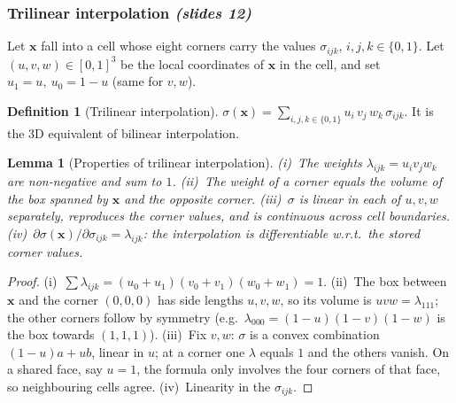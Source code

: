 \documentclass[11pt,a4paper]{article}
\newcommand{\xx}{\boldsymbol{x}}
\newcommand{\sref}[1]{\texorpdfstring{\emph{(slides #1)}}{(slides #1)}}
\theoremstyle{definition}
\newtheorem{definition}{Definition}[section]
\theoremstyle{plain}
\newtheorem{lemma}{Lemma}[section]
\begin{document}
\subsubsection*{Trilinear interpolation \sref{12}}

Let $\xx$ fall into a cell whose eight corners carry the values $\sigma_{ijk}$, $i,j,k\in\{0,1\}$. Let $(u,v,w)\in[0,1]^3$ be the local coordinates of $\xx$ in the cell, and set $u_1=u,\ u_0=1-u$ (same for $v,w$).

\begin{definition}[Trilinear interpolation]
$\displaystyle \sigma(\xx)=\sum_{i,j,k\in\{0,1\}}u_i\,v_j\,w_k\,\sigma_{ijk}.$
It is the 3D equivalent of bilinear interpolation.
\end{definition}

\begin{lemma}[Properties of trilinear interpolation]\label{lem:trilin}
(i)~The weights $\lambda_{ijk}=u_iv_jw_k$ are non-negative and sum to $1$.
(ii)~The weight of a corner equals the volume of the box spanned by $\xx$ and the \emph{opposite} corner.
(iii)~$\sigma$ is linear in each of $u,v,w$ separately, reproduces the corner values, and is continuous across cell boundaries.
(iv)~$\partial\sigma(\xx)/\partial\sigma_{ijk}=\lambda_{ijk}$: the interpolation is differentiable w.r.t.\ the stored corner values.
\end{lemma}
\begin{proof}
(i)~$\sum\lambda_{ijk}=(u_0+u_1)(v_0+v_1)(w_0+w_1)=1$. (ii)~The box between $\xx$ and the corner $(0,0,0)$ has side lengths $u,v,w$, so its volume is $uvw=\lambda_{111}$; the other corners follow by symmetry (e.g.\ $\lambda_{000}=(1-u)(1-v)(1-w)$ is the box towards $(1,1,1)$). (iii)~Fix $v,w$: $\sigma$ is a convex combination $(1-u)a+ub$, linear in $u$; at a corner one $\lambda$ equals $1$ and the others vanish. On a shared face, say $u=1$, the formula only involves the four corners of that face, so neighbouring cells agree. (iv)~Linearity in the $\sigma_{ijk}$.
\end{proof}
\end{document}
